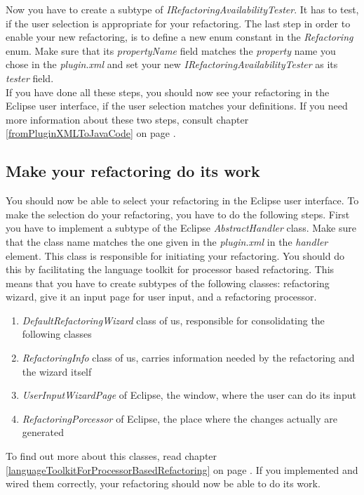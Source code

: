\documentclass[a4paper,10pt]{report}
\begin{document}
Now you have to create a subtype of {\it IRefactoringAvailabilityTester}. It has to test, if the user selection is appropriate for your refactoring.
The last step in order to enable your new refactoring, is to define a new enum constant in the {\it Refactoring} enum.
Make sure that its {\it propertyName} field matches the {\it property} name you chose in the {\it plugin.xml} and set your new {\it IRefactoringAvailabilityTester} as its {\it tester} field.\\
If you have done all these steps, you should now see your refactoring in the Eclipse user interface, if the user selection matches your definitions.
If you need more information about these two steps, consult chapter \ref{fromPluginXMLToJavaCode} on page \pageref{fromPluginXMLToJavaCode}.

\subsection{Make your refactoring do its work}
You should now be able to select your refactoring in the Eclipse user interface. To make the selection do your refactoring, you have to do the following steps.
First you have to implement a subtype of the Eclipse {\it AbstractHandler} class.
Make sure that the class name matches the one given in the {\it plugin.xml} in the {\it handler} element.
This class is responsible for initiating your refactoring. You should do this by facilitating the language toolkit for processor based refactoring.
This means that you have to create subtypes of the following classes: refactoring wizard, give it an input page for user input, and a refactoring processor.
   \begin{enumerate}
    \item {\it DefaultRefactoringWizard} class of us, responsible for consolidating the following classes
    \item {\it RefactoringInfo} class of us, carries information needed by the refactoring and the wizard itself
    \item {\it UserInputWizardPage} of Eclipse, the window, where the user can do its input
    \item {\it RefactoringPorcessor} of Eclipse, the place where the changes actually are generated
   \end{enumerate}
To find out more about this classes, read chapter \ref{languageToolkitForProcessorBasedRefactoring} on page \pageref{languageToolkitForProcessorBasedRefactoring}.
If you implemented and wired them correctly, your refactoring should now be able to do its work.\\
\end{document}
